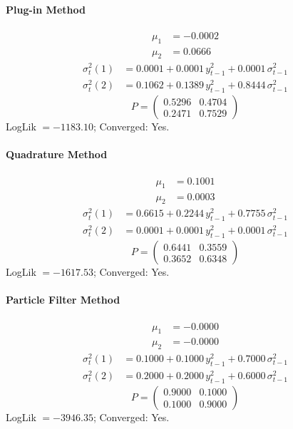 \documentclass[11pt, a4paper]{article}
\begin{document}
\paragraph{Plug-in Method}
\begin{align}
\mu_{1} &= -0.0002 \\
\mu_{2} &= 0.0666
\end{align}
\begin{align}
\sigma^2_{t}(1) &= 0.0001 + 0.0001\, y_{t-1}^2 + 0.0001\, \sigma^2_{t-1} \\
\sigma^2_{t}(2) &= 0.1062 + 0.1389\, y_{t-1}^2 + 0.8444\, \sigma^2_{t-1}
\end{align}
\begin{equation}
P = \begin{pmatrix} 0.5296 & 0.4704 \\ 0.2471 & 0.7529 \end{pmatrix}
\end{equation}
LogLik $= -1183.10$; Converged: Yes.

\paragraph{Quadrature Method}
\begin{align}
\mu_{1} &= 0.1001 \\
\mu_{2} &= 0.0003
\end{align}
\begin{align}
\sigma^2_{t}(1) &= 0.6615 + 0.2244\, y_{t-1}^2 + 0.7755\, \sigma^2_{t-1} \\
\sigma^2_{t}(2) &= 0.0001 + 0.0001\, y_{t-1}^2 + 0.0001\, \sigma^2_{t-1}
\end{align}
\begin{equation}
P = \begin{pmatrix} 0.6441 & 0.3559 \\ 0.3652 & 0.6348 \end{pmatrix}
\end{equation}
LogLik $= -1617.53$; Converged: Yes.

\paragraph{Particle Filter Method}
\begin{align}
\mu_{1} &= -0.0000 \\
\mu_{2} &= -0.0000
\end{align}
\begin{align}
\sigma^2_{t}(1) &= 0.1000 + 0.1000\, y_{t-1}^2 + 0.7000\, \sigma^2_{t-1} \\
\sigma^2_{t}(2) &= 0.2000 + 0.2000\, y_{t-1}^2 + 0.6000\, \sigma^2_{t-1}
\end{align}
\begin{equation}
P = \begin{pmatrix} 0.9000 & 0.1000 \\ 0.1000 & 0.9000 \end{pmatrix}
\end{equation}
LogLik $= -3946.35$; Converged: Yes.
\end{document}
